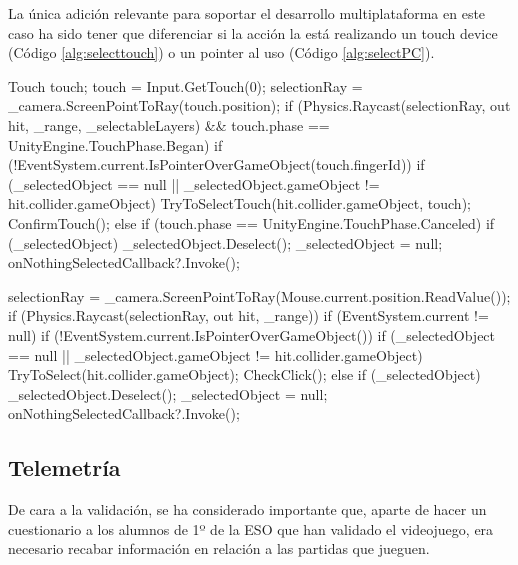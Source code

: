 La única adición relevante para soportar el desarrollo multiplataforma en este caso ha sido tener que diferenciar si la acción la está realizando un touch device (Código \ref{alg:selecttouch}) o un pointer al uso (Código \ref{alg:selectPC}).

\begin{mypython}[caption={Código para seleccionar una entidad en un 'Touch Device'.},label={alg:selecttouch}]
Touch touch;
touch = Input.GetTouch(0);
selectionRay = _camera.ScreenPointToRay(touch.position);
if (Physics.Raycast(selectionRay, out hit, _range, _selectableLayers) && touch.phase == UnityEngine.TouchPhase.Began)
{
    if (!EventSystem.current.IsPointerOverGameObject(touch.fingerId))
    {
        if (_selectedObject == null || _selectedObject.gameObject != hit.collider.gameObject)
        {
            TryToSelectTouch(hit.collider.gameObject, touch);
        }
        ConfirmTouch();
    }
}
else if (touch.phase == UnityEngine.TouchPhase.Canceled)
{
    if (_selectedObject)
    {
        _selectedObject.Deselect();
        _selectedObject = null;
        onNothingSelectedCallback?.Invoke();
    }
}
\end{mypython}

\begin{mypython}[caption={Código para seleccionar una entidad en PC.},label={alg:selectPC}]
selectionRay = _camera.ScreenPointToRay(Mouse.current.position.ReadValue());
if (Physics.Raycast(selectionRay, out hit, _range))
{
    if (EventSystem.current != null)
    {
        if (!EventSystem.current.IsPointerOverGameObject())
        {
            if (_selectedObject == null || _selectedObject.gameObject != hit.collider.gameObject)
            {
                TryToSelect(hit.collider.gameObject);
            }
            CheckClick();
        }
    }
}
else
{
    if (_selectedObject)
    {
        _selectedObject.Deselect();
        _selectedObject = null;
        onNothingSelectedCallback?.Invoke();
    }
}
\end{mypython}

\subsection{Telemetría}

De cara a la validación, se ha considerado importante que, aparte de hacer un cuestionario a los alumnos de 1º de la ESO que han validado el videojuego, era necesario recabar información en relación a las partidas que jueguen. 

